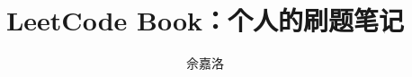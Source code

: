 \documentclass{kaobook}
\begin{document}
\renewcommand\contentsname{目录}
\renewcommand\listfigurename{插图}
\renewcommand\listtablename{表格}
\renewcommand\indexname{索引}
\renewcommand\bibname{参考文献}
\renewcommand\figurename{图}
\renewcommand\tablename{表}

\title{LeetCode Book：个人的刷题笔记}
\author{佘嘉洛}

\frontmatter
\maketitle
\tableofcontents



\mainmatter


\end{document}
